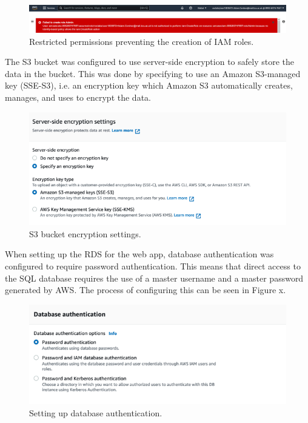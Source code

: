 \begin{figure}[!htbp]
    \centering
    \includegraphics[width=\textwidth]{resources/iam-denied}
    \caption{Restricted permissions preventing the creation of IAM roles.}
    \label{fig:iam-denied}
\end{figure}

The S3 bucket was configured to use server-side encryption to safely store the data in the bucket.
This was done by specifying to use an Amazon S3-managed key (SSE-S3), i.e. an encryption key which Amazon S3
automatically creates, manages, and uses to encrypt the data.

\begin{figure}[!htbp]
    \centering
    \includegraphics[width=\textwidth]{resources/s3_encryption}
    \caption{S3 bucket encryption settings.}
    \label{fig:s3-encryption}
\end{figure}

When setting up the RDS for the web app, database authentication was configured to require password authentication.
This means that direct access to the SQL database requires the use of a master username and a master password generated
by AWS.
The process of configuring this can be seen in Figure x.

\begin{figure}[!htbp]
    \centering
    \includegraphics[width=\textwidth]{resources/rds_authentication}
    \caption{Setting up database authentication.}
    \label{fig:setup-rds-auth}
\end{figure}

